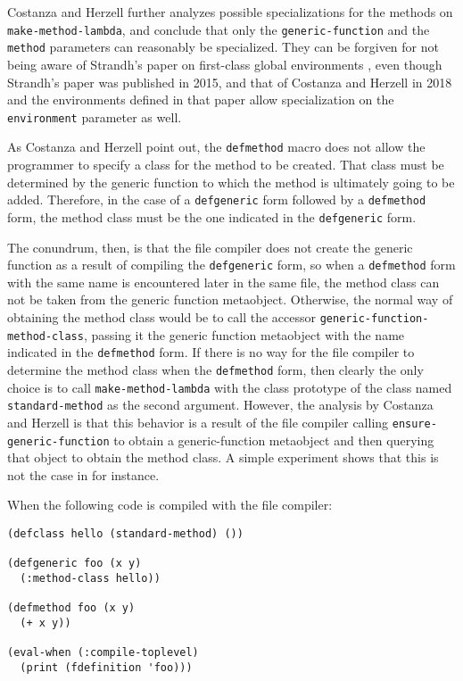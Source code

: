 Costanza and Herzell further analyzes possible specializations for the
methods on \texttt{make-method-lambda}, and conclude that only the
\texttt{generic-function} and the \texttt{method} parameters can
reasonably be specialized.  They can be forgiven for not being aware
of Strandh's paper on first-class global environments
\cite{Strandh:2015:ELS:Environments}, even though Strandh's paper was
published in 2015, and that of Costanza and Herzell in 2018 and the
environments defined in that paper allow specialization on the
\texttt{environment} parameter as well.

As Costanza and Herzell point out, the \texttt{defmethod} macro does
not allow the programmer to specify a class for the method to be
created.  That class must be determined by the generic function to
which the method is ultimately going to be added.  Therefore, in the
case of a \texttt{defgeneric} form followed by a \texttt{defmethod}
form, the method class must be the one indicated in the
\texttt{defgeneric} form.

The conundrum, then, is that the file compiler does not create the
generic function as a result of compiling the \texttt{defgeneric}
form, so when a \texttt{defmethod} form with the same name is
encountered later in the same file, the method class can not be taken
from the generic function metaobject.  Otherwise, the normal way of
obtaining the method class would be to call the accessor
\texttt{generic-function-method-class}, passing it the generic
function metaobject with the name indicated in the \texttt{defmethod}
form.  If there is no way for the file compiler to determine the
method class when the \texttt{defmethod} form, then clearly the only
choice is to call \texttt{make-method-lambda} with the class prototype
of the class named \texttt{standard-method} as the second argument.
However, the analysis by Costanza and Herzell is that this behavior is
a result of the file compiler calling \texttt{ensure-generic-function}
to obtain a generic-function metaobject and then querying that object
to obtain the method class.  A simple experiment shows that this is
not the case in \sbcl{} for instance.

When the following code is compiled with the \sbcl{} file compiler:

\begin{verbatim}
(defclass hello (standard-method) ())

(defgeneric foo (x y)
  (:method-class hello))

(defmethod foo (x y)
  (+ x y))

(eval-when (:compile-toplevel)
  (print (fdefinition 'foo)))
\end{verbatim}

